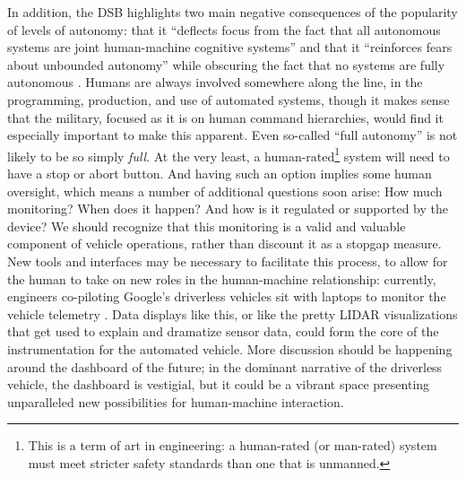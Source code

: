 In addition, the DSB highlights two main negative consequences of the popularity of
levels of autonomy: that it ``deflects focus from the fact that all
autonomous systems are joint human-machine cognitive systems'' and
that it ``reinforces fears about unbounded autonomy'' while obscuring
the fact that no systems are fully autonomous \cite[p. 24]{DSB}. Humans are always
involved somewhere along the line, in the programming, production,
and use of automated systems, though it makes sense that the military,
focused as it is on 
human command hierarchies, would find it especially important to make
this apparent. Even so-called ``full autonomy'' is not likely to be so
simply \emph{full}. At the very least, a human-rated\footnote{This is
  a term of art in engineering: a human-rated (or man-rated) system
  must meet stricter safety standards than one that is unmanned.}
system will need to have 
a stop or abort button. And having such an option implies some human
oversight, which means a number of additional questions soon arise:
How much monitoring? When does it happen? And how is it
regulated or supported by the device? We should recognize that this
monitoring is a valid and valuable component of vehicle operations,
rather than discount it as a stopgap measure. New tools and interfaces
may be necessary to facilitate this process, to allow for the human to
take on new roles in the human-machine relationship: currently, engineers
co-piloting Google's driverless vehicles sit with laptops to monitor
the vehicle telemetry \cite{bilgerAuto}. Data displays
like this, or like the pretty LIDAR visualizations that get used to
explain and dramatize sensor data, could  form the core of the
instrumentation for the automated vehicle. More discussion should be
happening around the dashboard of the future; in the dominant
narrative of the driverless vehicle, the dashboard is vestigial, but
it could be a vibrant space presenting unparalleled new possibilities
for human-machine interaction.


